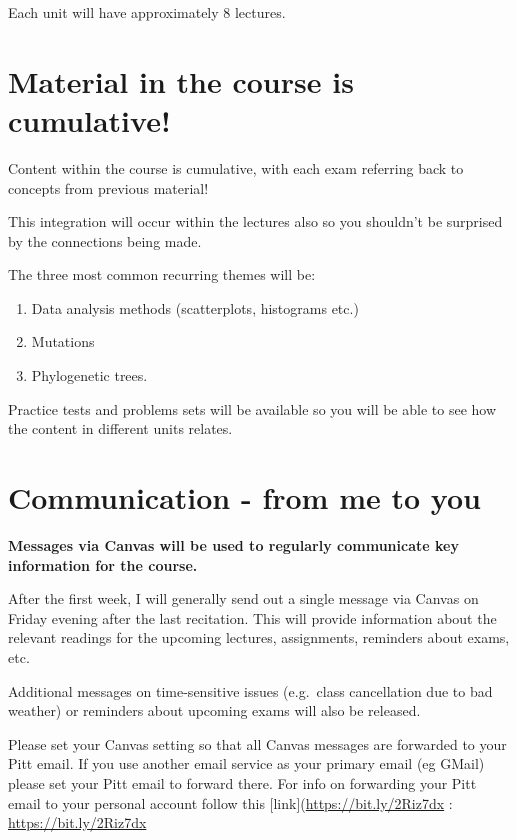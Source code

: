 \documentclass[
]{book}
\providecommand{\tightlist}{%
  \setlength{\itemsep}{0pt}\setlength{\parskip}{0pt}}
\begin{document}
Each unit will have approximately 8 lectures.

\hypertarget{material-in-the-course-is-cumulative}{%
\chapter{Material in the course is cumulative!}\label{material-in-the-course-is-cumulative}}

Content within the course is cumulative, with each exam referring back to concepts from previous material!

This integration will occur within the lectures also so you shouldn't be surprised by the connections being made.

The three most common recurring themes will be:

\begin{enumerate}
\def\labelenumi{\arabic{enumi}.}
\tightlist
\item
  Data analysis methods (scatterplots, histograms etc.)
\item
  Mutations
\item
  Phylogenetic trees.
\end{enumerate}

Practice tests and problems sets will be available so you will be able to see how the content in different units relates.

\hypertarget{communication-me2u}{%
\chapter{Communication - from me to you}\label{communication-me2u}}

\textbf{Messages via Canvas will be used to regularly communicate key information for the course.}

After the first week, I will generally send out a single message via Canvas on Friday evening after the last recitation. This will provide information about the relevant readings for the upcoming lectures, assignments, reminders about exams, etc.

Additional messages on time-sensitive issues (e.g.~class cancellation due to bad weather) or reminders about upcoming exams will also be released.

Please set your Canvas setting so that all Canvas messages are forwarded to your Pitt email. If you use another email service as your primary email (eg GMail) please set your Pitt email to forward there.
For info on forwarding your Pitt email to your personal account follow this {[}link{]}(\url{https://bit.ly/2Riz7dx} : \url{https://bit.ly/2Riz7dx}
\end{document}
